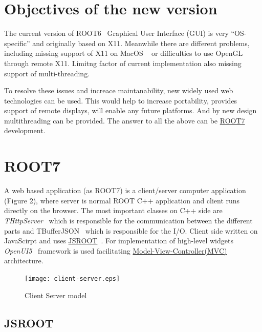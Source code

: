 \documentclass[a4paper]{jpconf}
\begin{document}
\section{Objectives of the new version}

The current version of ROOT6~\cite{root6} Graphical User Interface (GUI) is very ``OS-specific'' and originally based on X11.
Meanwhile there are different problems, including missing support of X11 on MacOS ~\cite{x11} or difficulties to use OpenGL through remote X11.
Limitng factor of current implementation also missing support of multi-threading. 

To resolve these issues and increace maintanability, new widely used web technologies can be used. This would help to increase portability, 
provides support of remote displays, will enable any future platforms. And by new design multithreading can be provided.
The answer to all the above can be \href{https://root.cern.ch/root-7}{ROOT7}~\cite{root7} development.

\section{ROOT7}

A web based application (as ROOT7) is a client/server computer application (Figure 2),
where server is normal ROOT C++ application and client runs directly on the browser.
The most important classes on C++ side are {\it THttpServer}~\cite{http} which is responsible
for the communication between the different parts and TBufferJSON~\cite{buffer}
which is responsible for the I/O. Client side written on JavaScirpt and uses \href{https://root.cern/js/}{JSROOT}~\cite{jsroot}. 
For implementation of high-level widgets \textit{OpenUI5}~\cite{openui} framework is used facilitating
\href{https://en.wikipedia.org/wiki/Model%E2%80%93view%E2%80%93controller}{Model-View-Controller(MVC)}~\cite{mvc}
architecture. 

\begin{figure}[h]
  \begin{center}
    \texttt{[image: client-server.eps]}\hspace{2pc}%
  \end{center}
  \centering
\begin{minipage}[b]{20pc}\caption{\label{label}Client Server model}
\end{minipage}
\end{figure}

\subsection{JSROOT}
\end{document}
